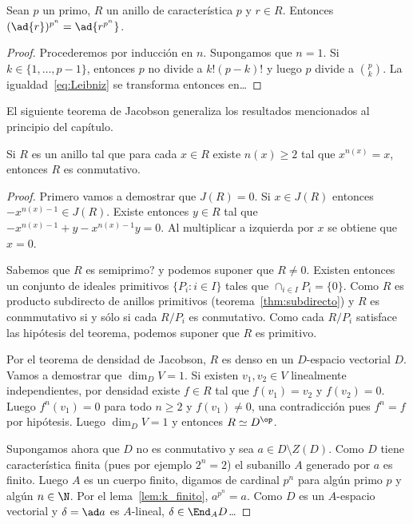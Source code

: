 \begin{lemma}
	\label{lem:Jacobson}
	Sean $p$ un primo, 
	$R$ un anillo de característica $p$ y $r\in R$. 
	Entonces $(\ad{r})^{p^n}=\ad{r^{p^n}}$. 
\end{lemma}

\begin{proof}
	Procederemos por inducción en $n$. Supongamos que $n=1$. Si $k\in\{1,\dots,p-1\}$, entonces 
	$p$ no divide a $k!(p-k)!$ y luego $p$ divide a $\binom{p}{k}$. La igualdad~\eqref{eq:Leibniz} se
	transforma entonces en\dots
\end{proof}

El siguiente teorema de Jacobson generaliza los resultados mencionados al
principio del capítulo.

\begin{theorem}[Jacobson]
	Si $R$ es un anillo tal que para cada $x\in R$ existe $n(x)\geq2$ tal que
	$x^{n(x)}=x$, entonces $R$ es conmutativo. 
\end{theorem}

\begin{proof}
	Primero vamos a demostrar que $J(R)=0$. Si $x\in J(R)$ entonces
	$-x^{n(x)-1}\in J(R)$. Existe entonces $y\in R$ tal que
	$-x^{n(x)-1}+y-x^{n(x)-1}y=0$. Al multiplicar a izquierda por $x$ se
	obtiene que $x=0$.

	Sabemos que $R$ es semiprimo? y podemos suponer que $R\ne0$. Existen
	entonces un conjunto de ideales primitivos $\{P_i:i\in I\}$ tales que
	$\cap_{i\in I}P_i=\{0\}$. Como $R$ es producto subdirecto de anillos primitivos 
	(teorema~\ref{thm:subdirecto}) y $R$ es conmmutativo si y sólo si cada
	$R/P_i$ es conmutativo. Como cada $R/P_i$ satisface las hipótesis del
	teorema, podemos suponer que $R$ es primitivo.

	Por el teorema de densidad de Jacobson, $R$ es denso en un $D$-espacio
	vectorial $D$.  Vamos a demostrar que $\dim_DV=1$. Si existen $v_1,v_2\in
	V$ linealmente independientes, por densidad existe $f\in R$ tal que
	$f(v_1)=v_2$ y $f(v_2)=0$.  Luego $f^n(v_1)=0$ para todo $n\geq2$ y
	$f(v_1)\ne 0$, una contradicción pues $f^n=f$ por hipótesis. Luego
	$\dim_DV=1$ y entonces $R\simeq D^{\op}$. 

	Supongamos ahora que $D$ no es conmutativo y sea $a\in D\setminus Z(D)$.
	Como $D$ tiene característica finita (pues por ejemplo $2^n=2$) el
	subanillo $A$ generado por $a$ es finito. Luego $A$ es un cuerpo finito,
	digamos de cardinal $p^n$ para algún primo $p$ y algún $n\in\N$. Por el
	lema~\ref{lem:k_finito}, $a^{p^n}=a$. Como $D$ es un $A$-espacio vectorial
	y $\delta=\ad a$ es $A$-lineal, $\delta\in\End_AD$\dots 
\end{proof}

